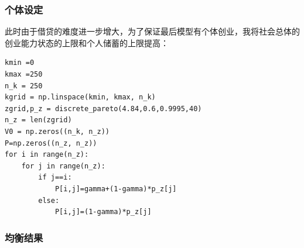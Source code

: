 \documentclass[a4paper, 12pt]{ctexart}
\begin{document}
\subsubsection{个体设定}
此时由于借贷的难度进一步增大，为了保证最后模型有个体创业，我将社会总体的创业能力状态的上限和个人储蓄的上限提高：
\begin{lstlisting}
kmin =0
kmax =250
n_k = 250
kgrid = np.linspace(kmin, kmax, n_k)
zgrid,p_z = discrete_pareto(4.84,0.6,0.9995,40)
n_z = len(zgrid)
V0 = np.zeros((n_k, n_z))
P=np.zeros((n_z, n_z))
for i in range(n_z):
    for j in range(n_z):
        if j==i:
            P[i,j]=gamma+(1-gamma)*p_z[j]
        else:
            P[i,j]=(1-gamma)*p_z[j]
\end{lstlisting}

\newpage

\subsubsection{均衡结果}
\begin{figure}[h]
    \centering
    \nonumber
\end{figure}
\end{document}
